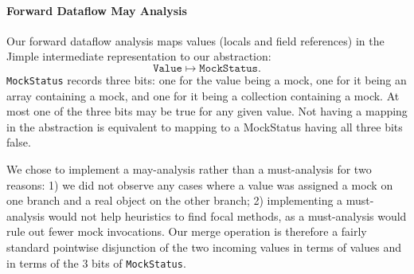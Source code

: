 


\paragraph{Forward Dataflow May Analysis}
\label{subsubsec:forward}

Our forward dataflow analysis maps values (locals and field references) in the Jimple intermediate representation to our abstraction:
\[ \mathtt{Value} \mapsto \mathtt{MockStatus}. \]
\texttt{MockStatus} records three bits: one for the value being a mock, one for it being an array containing a mock, and one for it being a collection containing a mock. At most one of the three bits may be true for any given value. Not having a mapping in the abstraction is equivalent to mapping to a MockStatus having all three bits false. 

We chose to implement a may-analysis rather than a must-analysis for two reasons: 1) we did not observe any cases where a value was assigned a mock on one branch and a real object on the other branch; 2) implementing a must-analysis would not help heuristics to find focal methods, as a must-analysis would rule out fewer mock invocations. Our merge operation is therefore a fairly standard pointwise disjunction of the two incoming values in terms of values and in terms of the 3 bits of \texttt{MockStatus}.



